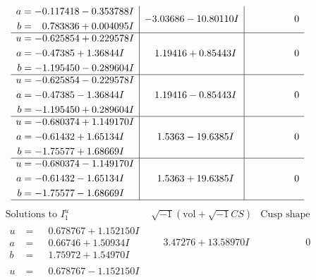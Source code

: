 \documentclass[1p]{elsarticle_modified}
\theoremstyle{definition}
\newcommand{\I}{\sqrt{-1}}
\begin{document}
$$\begin{array}{c|c|c}
\begin{aligned}
a &= -0.117418 - 0.353788 I \\
b &= \phantom{-}0.783836 + 0.004095 I\end{aligned}
 & -3.03686 - 10.80110 I & \phantom{-0.000000 } 0 \\ \hline\begin{aligned}
u &= -0.625854 + 0.229578 I \\
a &= -0.47385 + 1.36844 I \\
b &= -1.195450 - 0.289604 I\end{aligned}
 & \phantom{-}1.19416 + 0.85443 I & \phantom{-0.000000 } 0 \\ \hline\begin{aligned}
u &= -0.625854 - 0.229578 I \\
a &= -0.47385 - 1.36844 I \\
b &= -1.195450 + 0.289604 I\end{aligned}
 & \phantom{-}1.19416 - 0.85443 I & \phantom{-0.000000 } 0 \\ \hline\begin{aligned}
u &= -0.680374 + 1.149170 I \\
a &= -0.61432 + 1.65134 I \\
b &= -1.75577 + 1.68669 I\end{aligned}
 & \phantom{-}1.5363 - 19.6385 I & \phantom{-0.000000 } 0 \\ \hline\begin{aligned}
u &= -0.680374 - 1.149170 I \\
a &= -0.61432 - 1.65134 I \\
b &= -1.75577 - 1.68669 I\end{aligned}
 & \phantom{-}1.5363 + 19.6385 I & \phantom{-0.000000 } 0\\
 \hline 
 \end{array}$$\newpage$$\begin{array}{c|c|c}  
\text{Solutions to }I^u_{1}& \I (\text{vol} + \sqrt{-1}CS) & \text{Cusp shape}\\
 \hline 
\begin{aligned}
u &= \phantom{-}0.678767 + 1.152150 I \\
a &= \phantom{-}0.66746 + 1.50934 I \\
b &= \phantom{-}1.75972 + 1.54970 I\end{aligned}
 & \phantom{-}3.47276 + 13.58970 I & \phantom{-0.000000 } 0 \\ \hline\begin{aligned}
u &= \phantom{-}0.678767 - 1.152150 I \\

\end{aligned}
\end{array}$$
\end{document}
